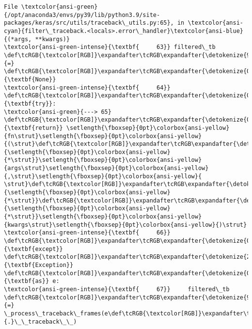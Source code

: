 \documentclass[11pt]{article}
\begin{document}
\begin{Verbatim}[commandchars=\\\{\}, frame=single, framerule=2mm, rulecolor=\color{outerrorbackground}]
File \textcolor{ansi-green}{/opt/anaconda3/envs/py39/lib/python3.9/site-packages/keras/src/utils/traceback\_utils.py:65}, in \textcolor{ansi-cyan}{filter\_traceback.<locals>.error\_handler}\textcolor{ansi-blue}{(*args, **kwargs)}
\textcolor{ansi-green-intense}{\textbf{     63}} filtered\_tb \def\tcRGB{\textcolor[RGB]}\expandafter\tcRGB\expandafter{\detokenize{98,98,98}}{=} \def\tcRGB{\textcolor[RGB]}\expandafter\tcRGB\expandafter{\detokenize{0,135,0}}{\textbf{None}}
\textcolor{ansi-green-intense}{\textbf{     64}} \def\tcRGB{\textcolor[RGB]}\expandafter\tcRGB\expandafter{\detokenize{0,135,0}}{\textbf{try}}:
\textcolor{ansi-green}{---> 65}     \def\tcRGB{\textcolor[RGB]}\expandafter\tcRGB\expandafter{\detokenize{0,135,0}}{\textbf{return}} \setlength{\fboxsep}{0pt}\colorbox{ansi-yellow}{fn\strut}\setlength{\fboxsep}{0pt}\colorbox{ansi-yellow}{(\strut}\def\tcRGB{\textcolor[RGB]}\expandafter\tcRGB\expandafter{\detokenize{98,98,98}}{\setlength{\fboxsep}{0pt}\colorbox{ansi-yellow}{*\strut}}\setlength{\fboxsep}{0pt}\colorbox{ansi-yellow}{args\strut}\setlength{\fboxsep}{0pt}\colorbox{ansi-yellow}{,\strut}\setlength{\fboxsep}{0pt}\colorbox{ansi-yellow}{ \strut}\def\tcRGB{\textcolor[RGB]}\expandafter\tcRGB\expandafter{\detokenize{98,98,98}}{\setlength{\fboxsep}{0pt}\colorbox{ansi-yellow}{*\strut}}\def\tcRGB{\textcolor[RGB]}\expandafter\tcRGB\expandafter{\detokenize{98,98,98}}{\setlength{\fboxsep}{0pt}\colorbox{ansi-yellow}{*\strut}}\setlength{\fboxsep}{0pt}\colorbox{ansi-yellow}{kwargs\strut}\setlength{\fboxsep}{0pt}\colorbox{ansi-yellow}{)\strut}
\textcolor{ansi-green-intense}{\textbf{     66}} \def\tcRGB{\textcolor[RGB]}\expandafter\tcRGB\expandafter{\detokenize{0,135,0}}{\textbf{except}} \def\tcRGB{\textcolor[RGB]}\expandafter\tcRGB\expandafter{\detokenize{215,95,95}}{\textbf{Exception}} \def\tcRGB{\textcolor[RGB]}\expandafter\tcRGB\expandafter{\detokenize{0,135,0}}{\textbf{as}} e:
\textcolor{ansi-green-intense}{\textbf{     67}}     filtered\_tb \def\tcRGB{\textcolor[RGB]}\expandafter\tcRGB\expandafter{\detokenize{98,98,98}}{=} \_process\_traceback\_frames(e\def\tcRGB{\textcolor[RGB]}\expandafter\tcRGB\expandafter{\detokenize{98,98,98}}{.}\_\_traceback\_\_)


\end{Verbatim}
\end{document}
